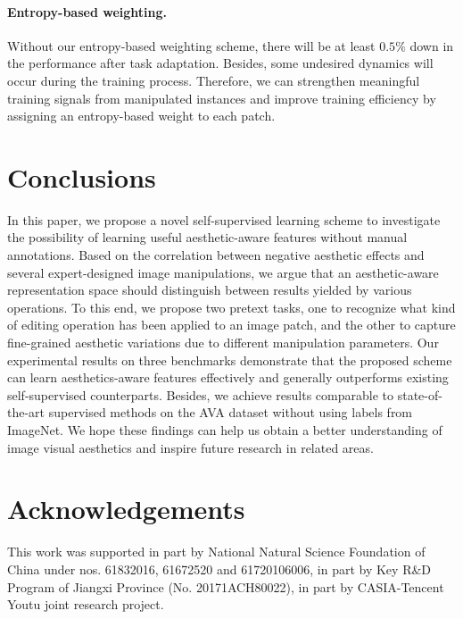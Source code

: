 \documentclass[letterpaper]{article}
\begin{document}
\paragraph{Entropy-based weighting.}
Without our entropy-based weighting scheme, there will be at least $0.5\%$ down in the performance after task adaptation.
Besides, some undesired dynamics will occur during the training process.
Therefore, we can strengthen meaningful training signals from manipulated instances and improve training efficiency by assigning an entropy-based weight to each patch.

\section{Conclusions}
In this paper, we propose a novel self-supervised learning scheme to investigate the possibility of learning useful aesthetic-aware features without manual annotations.
Based on the correlation between negative aesthetic effects and several expert-designed image manipulations, we argue that an aesthetic-aware representation space should distinguish between results yielded by various operations.
To this end, we propose two pretext tasks, one to recognize what kind of editing operation has been applied to an image patch, and the other to capture fine-grained aesthetic variations due to different manipulation parameters.
Our experimental results on three benchmarks demonstrate that the proposed scheme can learn aesthetics-aware features effectively and generally outperforms existing self-supervised counterparts.
Besides, we achieve results comparable to state-of-the-art supervised methods on the AVA dataset without using labels from ImageNet.
We hope these findings can help us obtain a better understanding of image visual aesthetics and inspire future research in related areas.

\section*{Acknowledgements}
\footnotesize{This work was supported in part by National Natural Science Foundation of China under nos. 61832016, 61672520 and 61720106006, in part by Key R\&D Program of Jiangxi Province (No. 20171ACH80022), in part by CASIA-Tencent Youtu joint research project.}



\end{document}
